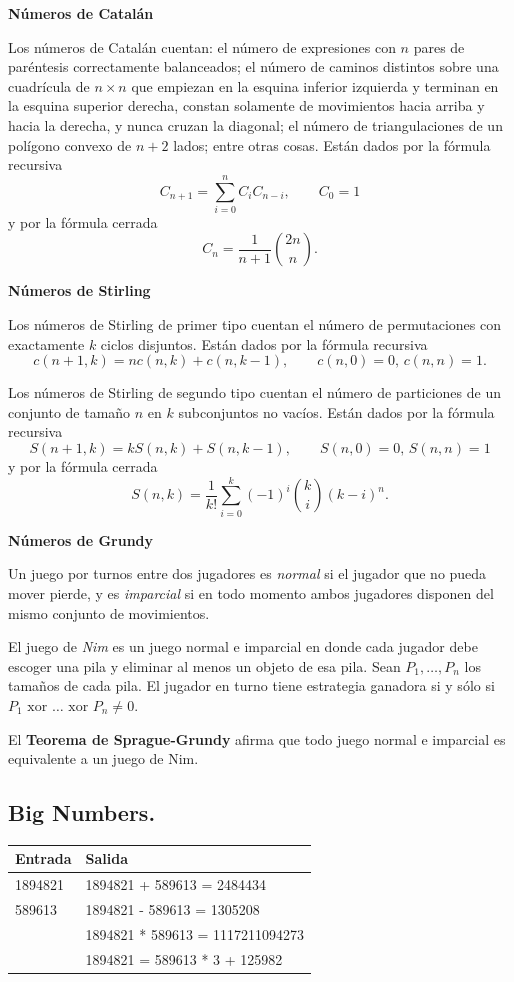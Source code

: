 \documentclass[11pt, letterpaper, twoside]{article}
\begin{document}
\textbf{Números de Catalán}

Los números de Catalán cuentan: el número de expresiones con $n$ pares de paréntesis correctamente balanceados; el número de caminos distintos sobre una cuadrícula de $n \times n$ que empiezan en la esquina inferior izquierda y terminan en la esquina superior derecha, constan solamente de movimientos hacia arriba y hacia la derecha, y nunca cruzan la diagonal; el número de triangulaciones de un polígono convexo de $n + 2$ lados; entre otras cosas. Están dados por la fórmula recursiva
$$C_{n+1} = \sum_{i=0}^n C_iC_{n-i}, \qquad C_0 = 1$$
y por la fórmula cerrada
$$C_n = \frac{1}{n + 1}\binom{2n}{n}.$$

\textbf{Números de Stirling}

Los números de Stirling de primer tipo cuentan el número de permutaciones con exactamente $k$ ciclos disjuntos. Están dados por la fórmula recursiva
$$c(n + 1, k) = nc(n, k) + c(n, k - 1), \qquad c(n, 0) =  0, \, c(n, n) = 1.$$

Los números de Stirling de segundo tipo cuentan el número de particiones de un conjunto de tamaño $n$ en $k$ subconjuntos no vacíos. Están dados por la fórmula recursiva
$$S(n + 1, k) = kS(n, k) + S(n, k - 1), \qquad S(n, 0) =  0, \, S(n, n) = 1$$
y por la fórmula cerrada
$$S(n, k) = \frac{1}{k!} \sum_{i=0}^k (-1)^i \binom{k}{i}(k - i)^n.$$

\textbf{Números de Grundy}

Un juego por turnos entre dos jugadores es \textit{normal} si el jugador que no pueda mover pierde, y es \textit{imparcial} si en todo momento ambos jugadores disponen del mismo conjunto de movimientos.

El juego de \textit{Nim} es un juego normal e imparcial en donde cada jugador debe escoger una pila y eliminar al menos un objeto de esa pila. Sean $P_1, \ldots, P_n$ los tamaños de cada pila. El jugador en turno tiene estrategia ganadora si y sólo si $P_1 \text{ xor } \ldots \text{ xor } P_n \neq 0$.

El \textbf{Teorema de Sprague-Grundy} afirma que todo juego normal e imparcial es equivalente a un juego de Nim.

\subsection{Big Numbers.}



\begin{tabular}{|p{7cm}|p{7cm}|}
\hline
\textbf{Entrada} & \textbf{Salida}\\ \hline
1894821 & 1894821 + 589613 = 2484434\\
589613  & 1894821 - 589613 = 1305208\\ 
        & 1894821 * 589613 = 1117211094273\\ 
        & 1894821 = 589613 * 3 + 125982\\ \hline
\end{tabular}\bigskip
\end{document}
